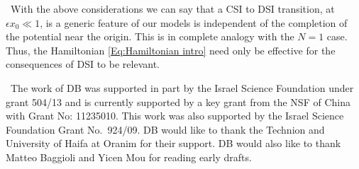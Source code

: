 \documentclass[aps,prl,reprint,preprintnumbers]{revtex4-1}
\begin{document}
{\ With the above considerations we can say that a CSI to DSI transition, at $\epsilon x_{0} \ll 1$, is a generic feature of our models is independent of the completion of the potential near the origin. This is in complete analogy with the $N=1$ case. Thus, the Hamiltonian \eqref{Eq:Hamiltonian intro} need only be effective for the consequences of DSI to be relevant.}

\begin{acknowledgments}
{\ The work of DB was supported in part by the Israel Science Foundation under grant 504/13 and is currently supported by a key grant from the NSF of China with Grant No: 11235010. This work was also supported by the Israel Science Foundation Grant No.~924/09. DB would like to thank the Technion and University of Haifa at Oranim for their support. DB would also like to thank Matteo Baggioli and Yicen Mou for reading early drafts.}
\end{acknowledgments}




% 
\clearpage

\clearpage

\clearpage

\end{document}
